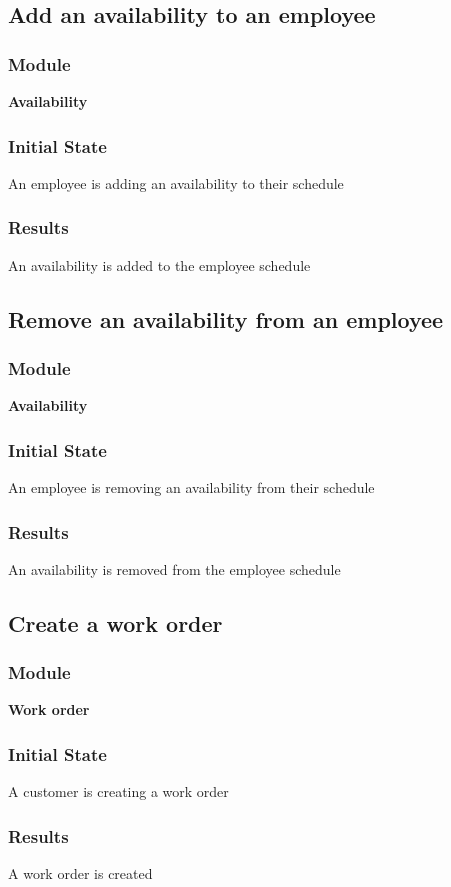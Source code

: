 \documentclass[12pt, titlepage]{article}
\begin{document}
\subsection{Add an availability to an employee}
    \subsubsection{Module}
    \textbf{Availability}
    \subsubsection{Initial State}
    An employee is adding an availability to their schedule
    \subsubsection{Results}
    An availability is added to the employee schedule

\subsection{Remove an availability from an employee}
    \subsubsection{Module}
    \textbf{Availability}
    \subsubsection{Initial State}
    An employee is removing an availability from their schedule
    \subsubsection{Results}
    An availability is removed from the employee schedule

\subsection{Create a work order}
    \subsubsection{Module}
    \textbf{Work order}
    \subsubsection{Initial State}
    A customer is creating a work order
    \subsubsection{Results}
    A work order is created
\end{document}
